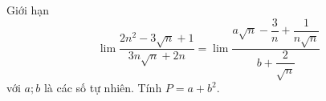 \begin{ex}
Giới hạn \[\lim\dfrac{2n^2-3\sqrt n+1}{3n\sqrt n+2n}=\lim\dfrac{a\sqrt n-\dfrac3n+\dfrac1{n\sqrt n}}{b+\dfrac2{\sqrt n}}\] với $a;b$ là các số tự nhiên. Tính $P=a+b^2$.
\end{ex}
